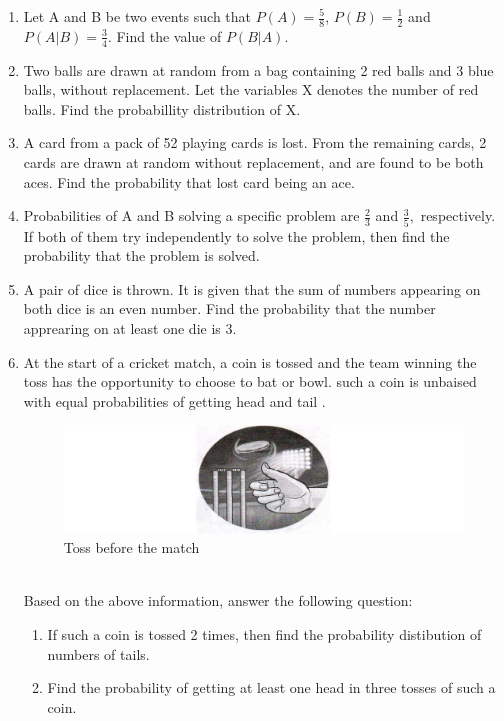 \begin{enumerate}[label=\thesection.\arabic*.,ref=\thesection.\theenumi]
\item Let A and B be two events such that $P(A) = \frac{5}{8}$, $P(B) = \frac{1}{2}$ and  $P(A|B) = \frac{3}{4}$. Find the value of $P(B|A)$.
\item Two balls are drawn at random from a bag containing 2 red balls and 3 blue balls, without replacement. Let the variables X denotes the number of red balls. Find the probabillity distribution of X.
\item A card from a pack of 52 playing cards is lost. From the remaining cards, 2 cards are drawn at random without replacement, and are found to be both aces. Find the probability that lost card being an ace.
\item Probabilities of A and B solving a specific problem are $\frac{2}{3}$ and $\frac{3}{5},$ respectively. If both of them try independently to solve the problem, then find the probability that the problem is  solved.
\item A pair of dice is thrown. It is given that the sum of numbers  appearing on both dice is an even number. Find the probability that the number apprearing on at least one die is 3.
\item At the start of a cricket match, a coin is tossed and the team winning the toss has the opportunity to choose to bat or bowl. such a coin is unbaised with equal probabilities of getting head and tail  .
\begin{figure}[!ht]
\centering
\includegraphics[width=\columnwidth]{figs/coin}
\caption{Toss before the match}
\label{fig:2022/probability/coin1}
\end{figure}
\\ Based on the above information, answer the following question:
\begin{enumerate}
\item If such a coin is tossed 2 times, then find the probability distibution of numbers of tails.
\item Find the probability of getting at least one head in three tosses of such a coin.

\end{enumerate}
\end{enumerate}
